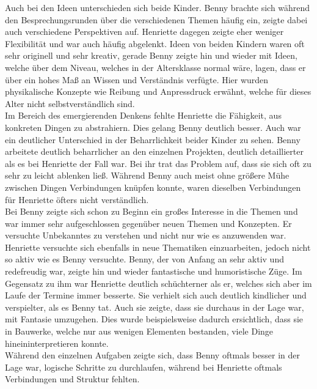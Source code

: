 Auch bei den Ideen unterschieden sich beide Kinder. Benny brachte sich während den Besprechungsrunden über die verschiedenen Themen häufig ein, zeigte dabei auch verschiedene Perspektiven auf. Henriette dagegen zeigte eher weniger Flexibilität und war auch häufig abgelenkt. Ideen von beiden Kindern waren oft sehr originell und sehr kreativ, gerade Benny zeigte hin und wieder mit Ideen, welche über dem Niveau, welches in der Altersklasse normal wäre, lagen, dass er über ein hohes Maß an Wissen und Verständnis verfügte. Hier wurden physikalische Konzepte wie Reibung und Anpressdruck erwähnt, welche für dieses Alter nicht selbstverständlich sind.\\
Im Bereich des emergierenden Denkens fehlte Henriette die Fähigkeit, aus konkreten Dingen zu abstrahiern. Dies gelang Benny deutlich besser. Auch war ein deutlicher Unterschied in der Beharrlichkeit beider Kinder zu sehen. Benny arbeitete deutlich beharrlicher an den einzelnen Projekten, deutlich detaillierter als es bei Henriette der Fall war. Bei ihr trat das Problem auf, dass sie sich oft zu sehr zu leicht ablenken ließ. Während Benny auch meist ohne größere Mühe zwischen Dingen Verbindungen knüpfen konnte, waren dieselben Verbindungen für Henriette öfters nicht verständlich. \\
Bei Benny zeigte sich schon zu Beginn ein großes Interesse in die Themen und war immer sehr aufgeschlossen gegenüber neuen Themen und Konzepten. Er versuchte Unbekanntes zu verstehen und nicht nur wie es anzuwenden war. Henriette versuchte sich ebenfalls in neue Thematiken einzuarbeiten, jedoch nicht so aktiv wie es Benny versuchte. Benny, der von Anfang an sehr aktiv und redefreudig war, zeigte hin und wieder fantastische und humoristische Züge. Im Gegensatz zu ihm war Henriette deutlich schüchterner als er, welches sich aber im Laufe der Termine immer besserte. Sie verhielt sich auch deutlich kindlicher und verspielter, als es Benny tat. Auch sie zeigte, dass sie durchaus in der Lage war, mit Fantasie umzugehen. Dies wurde beispielsweise dadurch ersichtlich, dass sie in Bauwerke, welche nur aus wenigen Elementen bestanden, viele Dinge hineininterpretieren konnte.\\
Während den einzelnen Aufgaben zeigte sich, dass Benny oftmals besser in der Lage war, logische Schritte zu durchlaufen, während bei Henriette oftmals Verbindungen und Struktur fehlten.

